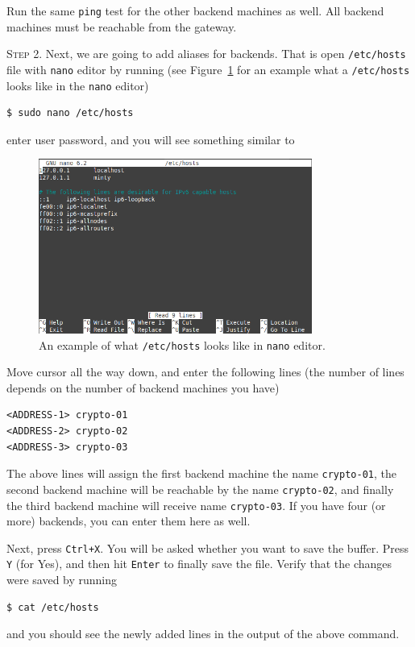 \documentclass{article}
\begin{document}
Run the same \texttt{ping} test for the other backend machines as well. All backend machines must be reachable from the gateway. 

\vspace{0.5cm}

\textsc{Step 2}. Next, we are going to add aliases for backends. That is open \texttt{/etc/hosts} file with \texttt{nano} editor by running (see Figure~\ref{fig:1} for an example what a \texttt{/etc/hosts} looks like in the \texttt{nano} editor)
\begin{lstlisting}[language=bash]
$ sudo nano /etc/hosts
\end{lstlisting}
enter user password, and you will see something similar to
\begin{figure}[h]
    \centering
    \includegraphics[width=0.8\textwidth]{nano-1}
    \caption{An example of what \texttt{/etc/hosts} looks like in \texttt{nano} editor.}
    \label{fig:1}
\end{figure}

Move cursor all the way down, and enter the following lines (the number of lines depends on the number of backend machines you have)
\begin{lstlisting}
<ADDRESS-1> crypto-01
<ADDRESS-2> crypto-02
<ADDRESS-3> crypto-03
\end{lstlisting}
The above lines will assign the first backend machine the name \texttt{crypto-01}, the second backend machine will be reachable by the name \texttt{crypto-02}, and finally the third backend machine will receive name \texttt{crypto-03}. If you have four (or more) backends, you can enter them here as well.

Next, press \texttt{Ctrl+X}. You will be asked whether you want to save the buffer. Press \texttt{Y} (for Yes), and then hit \texttt{Enter} to finally save the file. Verify that the changes were saved by running
\begin{lstlisting}[language=bash]
$ cat /etc/hosts
\end{lstlisting}
and you should see the newly added lines in the output of the above command.
\end{document}
